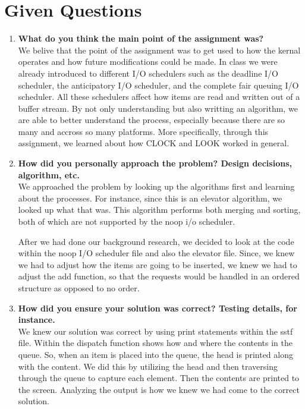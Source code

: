 \documentclass[10pt, onecolumn, letterpaper, draftclsnofoot]{IEEEtran}
\begin{document}
\section{Given Questions}
\begin{enumerate}
\item{\textbf{What do you think the main point of the assignment was?}}\\
We belive that the point of the assignment was to get used to how the kernal operates and how future modifications could be made. In class we were already introduced to different I/O schedulers such as the deadline I/O scheduler, the anticipatory I/O scheduler, and the complete fair queuing I/O scheduler. All these schedulers affect how items are read and written out of a buffer stream. By not only understanding but also writting an algorithm, we are able to better understand the process, especially because there are so many and accross so many platforms. More specifically, through this assignment, we learned about how CLOCK and LOOK worked in general. 

\item{\textbf{How did you personally approach the problem? Design decisions, algorithm, etc.}}\\
We approached the problem by looking up the algorithms first and learning about the processes. For instance, since this is an elevator algorithm, we looked up what that was. This algorithm performs both merging and sorting, both of which are not supported by the noop i/o scheduler. 

After we had done our background research, we decided to look at the code within the noop I/O scheduler file and also the elevator file. Since, we knew we had to adjust how the items are going to be inserted, we knew we had to adjust the add function, so that the requests would be handled in an ordered structure as opposed to no order. 

\item{\textbf{How did you ensure your solution was correct? Testing details, for instance.}}\\
We knew our solution was correct by using print statements within the sstf file. Within the dispatch function shows how and where the contents in the queue. So, when an item is placed into the queue, the head is printed along with the content. We did this by utilizing the head and then traversing through the queue to capture each element. Then the contents are printed to the screen. Analyzing the output is how we knew we had come to the correct solution.


\end{enumerate}
\end{document}
